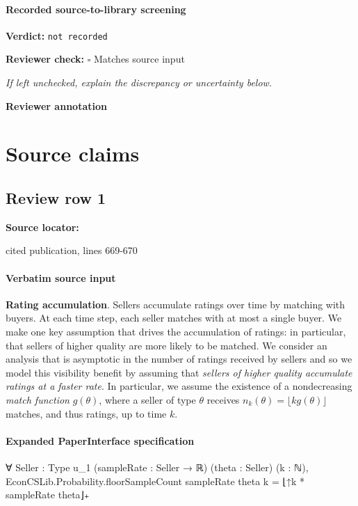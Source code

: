 \documentclass[10pt]{article}
\newcommand{\reviewerbox}{%
  \par\noindent\fbox{\parbox{0.96\linewidth}{\rule{0pt}{0.38in}}}\par
}
\newcommand{\reviewmatch}[1]{%
  \par\noindent\textbf{Reviewer check:} $\square$\; #1\par
  \noindent\emph{If left unchecked, explain the discrepancy or uncertainty below.}\par
}
\begin{document}
\paragraph{Recorded source-to-library screening}
\textbf{Verdict:} \texttt{not recorded}
\reviewmatch{Matches source input}
\noindent\textbf{Reviewer annotation}\par
\reviewerbox

\clearpage
\hypertarget{source-claim-08e48b913029b561}{}
\hypertarget{source-section-f10b5f68e4acf3dc}{}
\section*{Source claims}
\subsection*{Review row 1}
\textbf{Source locator:} {\footnotesize\raggedright cited publication, lines 669-\allowbreak{}670\par}
\paragraph{Verbatim source input}
\begin{ReviewVerbatim}
{\bf Rating accumulation}.  Sellers accumulate ratings over time by matching with buyers. At each time step, each seller matches with at most a single buyer. We make one key assumption that drives the accumulation of ratings: in particular, that sellers of higher quality are more likely to be matched. %
We consider an analysis that is asymptotic in the number of ratings received by sellers and so we model this visibility benefit by assuming that {\em sellers of higher quality accumulate ratings at a faster rate}. In particular, we assume the existence of a nondecreasing {\em match function} $g(\theta)$, where a seller of type $\theta$ receives $n_k(\theta) = \lfloor k g(\theta) \rfloor$ matches, and thus ratings, up to time $k$.
\end{ReviewVerbatim}


\paragraph{Expanded PaperInterface specification}
\begin{ReviewVerbatim}
∀ {Seller : Type u_1} (sampleRate : Seller → ℝ) (theta : Seller) (k : ℕ),
  EconCSLib.Probability.floorSampleCount sampleRate theta k = ⌊↑k * sampleRate theta⌋₊
\end{ReviewVerbatim}
\end{document}
